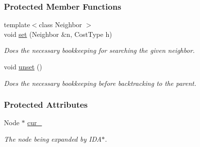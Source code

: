 \subsubsection*{Protected Member Functions}
\begin{DoxyCompactItemize}
\item 
{\footnotesize template$<$class Neighbor $>$ }\\void \hyperlink{structslb_1_1ext_1_1policy_1_1backtrackLock_1_1InplaceBase_a805ae83a7f9d9fb79de6894db7c85bea}{set} (Neighbor \&n, Cost\+Type h)
\begin{DoxyCompactList}\small\item\em Does the necessary bookkeeping for searching the given neighbor. \end{DoxyCompactList}\item 
void \hyperlink{structslb_1_1ext_1_1policy_1_1backtrackLock_1_1InplaceBase_a5ac11057420d465ee33087c504c026e0}{unset} ()\hypertarget{structslb_1_1ext_1_1policy_1_1backtrackLock_1_1InplaceBase_a5ac11057420d465ee33087c504c026e0}{}\label{structslb_1_1ext_1_1policy_1_1backtrackLock_1_1InplaceBase_a5ac11057420d465ee33087c504c026e0}

\begin{DoxyCompactList}\small\item\em Does the necessary bookkeeping before backtracking to the parent. \end{DoxyCompactList}\end{DoxyCompactItemize}
\subsubsection*{Protected Attributes}
\begin{DoxyCompactItemize}
\item 
Node $\ast$ \hyperlink{structslb_1_1ext_1_1policy_1_1backtrackLock_1_1InplaceBase_a3e9e83ff286e8f93a4ff2d52678d4d7e}{cur\+\_\+}\hypertarget{structslb_1_1ext_1_1policy_1_1backtrackLock_1_1InplaceBase_a3e9e83ff286e8f93a4ff2d52678d4d7e}{}\label{structslb_1_1ext_1_1policy_1_1backtrackLock_1_1InplaceBase_a3e9e83ff286e8f93a4ff2d52678d4d7e}

\begin{DoxyCompactList}\small\item\em The node being expanded by I\+D\+A$\ast$. \end{DoxyCompactList}\end{DoxyCompactItemize}

